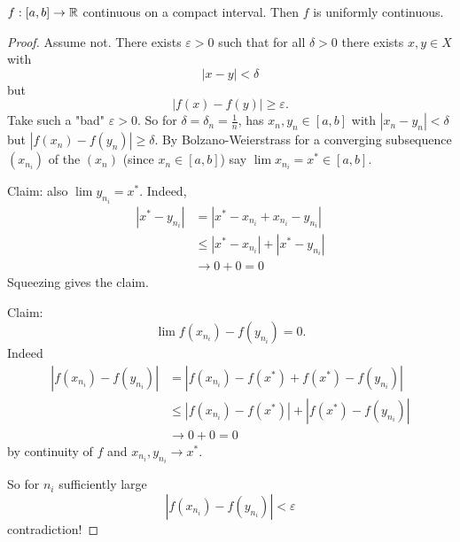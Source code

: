 \documentclass[10pt, a4paper]{article}
\begin{document}
\begin{theorem}
    $f : [a, b] \rightarrow \mathbb{R}$ continuous on a compact interval.
    Then $f$ is uniformly continuous.
    \begin{proof}
        Assume not.
        There exists $\varepsilon > 0$ such that for all $\delta > 0$ there exists $x, y \in X$ with
        \[
        |x - y| < \delta
        \]
        but
        \[
        |f(x) - f(y)| \geq \varepsilon.
        \]
        Take such a "bad" $\varepsilon > 0$.
        So for $\delta = \delta_n = \frac{1}{n}$,
        has $x_n, y_n \in [a, b]$ with $|x_n - y_n| < \delta$ but $|f(x_n) - f(y_n)| \geq \delta$.
        By Bolzano-Weierstrass for a converging subsequence $(x_{n_i})$ of the $(x_n)$
        (since $x_n \in [a, b]$)
        say $\lim x_{n_i} = x ^ {*} \in [a, b]$.

        Claim:
        also $\lim y_{n_i} = x ^ {*}$.
        Indeed,
        \begin{align*}
            |x ^ {*} - y_{n_i}| &= |x ^ {*} - x_{n_i} + x_{n_i} - y_{n_i}| \\
            &\leq |x ^ {*} - x_{n_i}| + |x ^ {*} - y_{n_i}| \\
            &\rightarrow 0 + 0 = 0
        \end{align*}
        Squeezing gives the claim.

        Claim:
        \[
        \lim f(x_{n_i}) - f(y_{n_i}) = 0.
        \]
        Indeed
        \begin{align*}
            |f(x_{n_i}) - f(y_{n_i})| &= |f(x_{n_i}) - f(x ^ {*}) + f(x ^ {*}) - f(y_{n_i})| \\
            &\leq |f(x_{n_i}) - f(x ^ {*})| + |f(x ^ {*}) - f(y_{n_i})| \\
            &\rightarrow 0 + 0 = 0
        \end{align*}
        by continuity of $f$ and $x_{n_i}, y_{n_i} \rightarrow x ^ {*}$.

        So for $n_i$ sufficiently large
        \[
        |f(x_{n_i}) - f(y_{n_i})| < \varepsilon
        \]
        contradiction!
    \end{proof}
\end{theorem}
\end{document}
